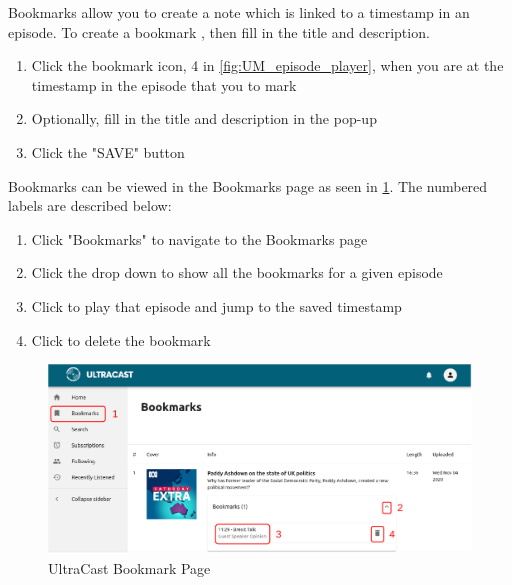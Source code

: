 \documentclass[../report.tex]{subfiles}
\begin{document}
Bookmarks allow you to create a note which is linked to a timestamp in an episode. To create a bookmark , then fill in the title and description. 
\begin{enumerate}
    \item Click the bookmark icon, 4 in \cref{fig:UM_episode_player}, when you are at the timestamp in the episode that you to mark
    \item Optionally, fill in the title and description in the pop-up
    \item Click the "SAVE" button
\end{enumerate}
%
Bookmarks can be viewed in the Bookmarks page as seen in \cref{fig:UM_bookmark}. The numbered labels are described below:
\begin{enumerate}
    \item Click "Bookmarks" to navigate to the Bookmarks page
    \item Click the drop down to show all the bookmarks for a given episode
    \item Click to play that episode and jump to the saved timestamp
    \item Click to delete the bookmark
\end{enumerate}
\begin{figure}[ht]
    \centering
    \includegraphics[width=16cm]{resources/UM_Bookmark}
    \caption{UltraCast Bookmark Page}
    \label{fig:UM_bookmark} 
\end{figure}
\end{document}
